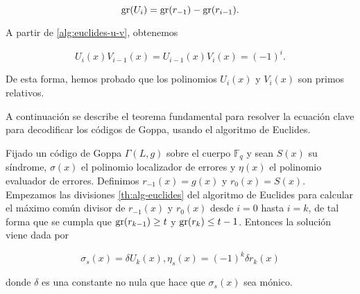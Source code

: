 \begin{equation}
    \label{prop:euclides-grado-u}
    \operatorname{gr}(U_i) = \operatorname{gr}(r_{-1}) - \operatorname{gr}(r_{i-1}).
\end{equation}

A partir de \eqref{alg:euclides-u-v}, obtenemos

\begin{equation}
    \label{prop:euclides-primos-rel}
    U_i(x) V_{i-1}(x) = U_{i-1}(x) V_i(x) = (-1)^i.
\end{equation}

De esta forma, hemos probado que los polinomios $U_i(x)$ y $V_i(x)$ son primos relativos.

A continuación se describe el teorema fundamental para resolver la ecuación clave para decodificar los códigos de Goppa, usando el algoritmo de Euclides.

\begin{theorem}
    \label{th:alg-Sugiyama}
    Fijado un código de Goppa $\Gamma(L, g)$ sobre el cuerpo $\mathbb{F}_q$ y sean $S(x)$ su síndrome, $\sigma(x)$ el polinomio localizador de errores y $\eta(x)$ el polinomio evaluador de errores. Definimos $r_{-1}(x) = g(x)$ y $r_0(x) = S(x)$. Empezamos las divisiones \ref{th:alg-euclides} del algoritmo de Euclides para calcular el máximo común divisor de $r_{-1}(x)$ y $r_0(x)$ desde $i = 0$ hasta $i = k$, de tal forma que se cumpla que $\operatorname{gr}(r_{k-1}) \geq t$ y $\operatorname{gr}(r_k) \leq t - 1$. Entonces la solución viene dada por

    \begin{equation}
        \label{th:sol-Goppa}
        \sigma_s(x) = \delta U_k (x),
        \eta_s(x) = (-1)^k \delta r_k(x)
    \end{equation}

    donde $\delta$ es una constante no nula que hace que $\sigma_s(x)$ sea mónico.
\end{theorem}


